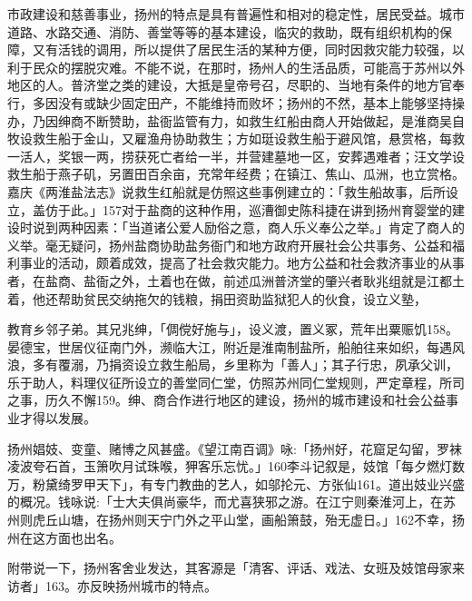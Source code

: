 市政建设和慈善事业，扬州的特点是具有普遍性和相对的稳定性，居民受益。城市道路、水路交通、消防、善堂等等的基本建设，临灾的救助，既有组织机构的保障，又有活钱的调用，所以提供了居民生活的某种方便，同时因救灾能力较强，以利于民众的摆脱灾难。不能不说，在那时，扬州人的生活品质，可能高于苏州以外地区的人。普济堂之类的建设，大抵是皇帝号召，尽职的、当地有条件的地方官奉行，多因没有或缺少固定田产，不能维持而败坏；扬州的不然，基本上能够坚持操办，乃因绅商不断赞助，盐衙监管有力，如救生红船由商人开始做起，是淮商吴自牧设救生船于金山，又雇渔舟协助救生；方如珽设救生船于避风馆，悬赏格，每救一活人，奖银一两，捞获死亡者给一半，并营建墓地一区，安葬遇难者；汪文学设救生船于燕子矶，另置田百余亩，充常年经费；在镇江、焦山、瓜洲，也立赏格。嘉庆《两淮盐法志》说救生红船就是仿照这些事例建立的：「救生船故事，后所设立，盖仿于此。」157对于盐商的这种作用，巡漕御史陈科捷在讲到扬州育婴堂的建设时说到两种因素：「当道诸公爱人励俗之意，商人乐义奉公之举。」肯定了商人的义举。毫无疑问，扬州盐商协助盐务衙门和地方政府开展社会公共事务、公益和福利事业的活动，颇着成效，提高了社会救灾能力。地方公益和社会救济事业的从事者，在盐商、盐衙之外，土着也在做，前述瓜洲普济堂的肇兴者耿兆组就是江都土着，他还帮助贫民交纳拖欠的钱粮，捐田资助监狱犯人的伙食，设立义塾，

\vfill
\begin{BookNotes}
\end{BookNotes}

\noindent 教育乡邻子弟。其兄兆绅，「倜傥好施与」，设义渡，置义冢，荒年出粟赈饥158。晏德宝，世居仪征南门外，濒临大江，附近是淮南制盐所，船舶往来如织，每遇风浪，多有覆溺，乃捐资设立救生船局，乡里称为「善人」；其子行忠，夙承父训，乐于助人，料理仪征所设立的善堂同仁堂，仿照苏州同仁堂规则，严定章程，所司之事，历久不懈159。绅、商合作进行地区的建设，扬州的城市建设和社会公益事业才得以发展。


扬州娼妓、变童、赌博之风甚盛。《望江南百调》咏:「扬州好，花窟足勾留，罗袜凌波夸石首，玉箫吹月试珠喉，狎客乐忘忧。」160李斗记叙是，妓馆「每夕燃灯数万，粉黛绮罗甲天下」，有专门教曲的艺人，如邬抡元、方张仙161。道出妓业兴盛的概况。钱咏说:「士大夫俱尚豪华，而尤喜狭邪之游。在江宁则秦淮河上，在苏州则虎丘山塘，在扬州则天宁门外之平山堂，画船箫鼓，殆无虚日。」162不幸，扬州在这方面也出名。

附带说一下，扬州客舍业发达，其客源是「清客、评话、戏法、女班及妓馆母家来访者」163。亦反映扬州城市的特点。

